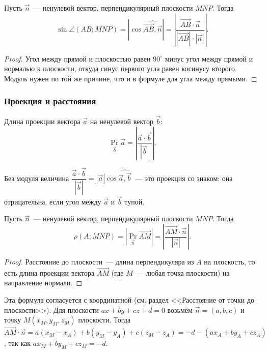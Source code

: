 \documentclass[12pt]{article}
\begin{document}
    \begin{statement}
    	Пусть $\vec{n}$~--- ненулевой вектор, перпендикулярный плоскости $MNP$. Тогда
    	\[
    		\sin \angle (AB; MNP) = \left| \cos \widehat{\vec{AB}, \vec{n}} \right| = \left| \dfrac{\vec{AB} \cdot \vec{n}}{|\vec{AB}| \cdot |\vec{n}|} \right|.
    	\]
    \end{statement}
    
    \begin{proof}
    	Угол между прямой и плоскостью равен $90^\circ$ минус угол между прямой и нормалью к плоскости, откуда синус первого угла равен косинусу второго. Модуль нужен по той же причине, что и в формуле для угла между прямыми.
    \end{proof}
    
    \subsubsection{Проекция и расстояния}
    
    \begin{definition}
    	Длина проекции вектора $\vec{a}$ на ненулевой вектор $\vec{b}$:
    	\[
    		\operatorname{Pr}_{\vec{b}} \vec{a} = \left| \dfrac{\vec{a} \cdot \vec{b}}{|\vec{b}|} \right|.
    	\]
    \end{definition}
    
    \begin{note}
    	Без модуля величина $\dfrac{\vec{a} \cdot \vec{b}}{|\vec{b}|} = |\vec{a}| \cos \widehat{\vec{a}, \vec{b}}$~--- это проекция со знаком: она отрицательна, если угол между $\vec{a}$ и $\vec{b}$ тупой.
    \end{note}
    
    \begin{statement}
    	Пусть $\vec{n}$~--- ненулевой вектор, перпендикулярный плоскости $MNP$. Тогда
    	\[
    		\rho(A; MNP) = \left| \operatorname{Pr}_{\vec{n}} \vec{AM} \right| = \left| \dfrac{\vec{AM} \cdot \vec{n}}{|\vec{n}|} \right|.
    	\]
    \end{statement}
    
    \begin{proof}
    	Расстояние до плоскости~--- длина перпендикуляра из $A$ на плоскость, то есть длина проекции вектора $\vec{AM}$ (где $M$~--- любая точка плоскости) на направление нормали.
    \end{proof}
    
    \begin{note}
    	Эта формула согласуется с координатной (см. раздел <<Расстояние от точки до плоскости>>). Для плоскости $ax + by + cz + d = 0$ возьмём $\vec{n} = (a, b, c)$ и точку $M(x_M, y_M, z_M)$ плоскости. Тогда $\vec{AM} \cdot \vec{n} = a(x_M - x_A) + b(y_M - y_A) + c(z_M - z_A) = -d - (ax_A + by_A + cz_A)$, так как $ax_M + by_M + cz_M = -d$.
    \end{note}
    
\end{document}
